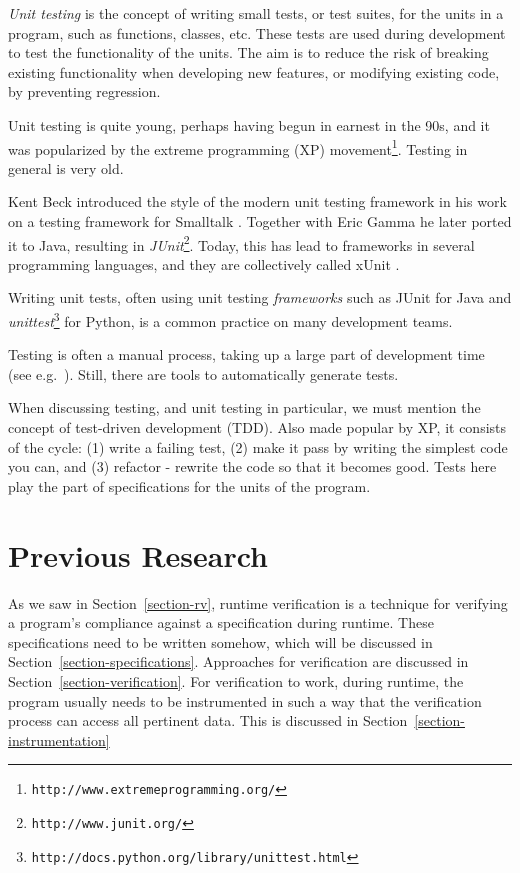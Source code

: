 \documentclass[a4paper,11pt]{kth-mag}
\begin{document}
\textit{Unit testing} is the concept of writing small tests, or test suites,
for the units in a program, such as functions, classes, etc. These tests are
used during development to test the functionality of the units. The aim is to
reduce the risk of breaking existing functionality when developing new
features, or modifying existing code, by preventing regression.

Unit testing is quite young, perhaps having begun in earnest in the 90s, and it
was popularized by the extreme programming (XP)
movement\footnote{\texttt{http://www.extremeprogramming.org/}}. Testing in
general is very old.

Kent Beck introduced the style of the modern unit testing framework in his work
on a testing framework for Smalltalk \cite{becksmalltalktesting}. Together
with Eric Gamma he later ported it to Java, resulting in
\textit{JUnit}\footnote{\texttt{http://www.junit.org/}}.
Today, this has lead to frameworks in several programming languages, and they
are collectively called xUnit \cite{fowlerxunit}.

Writing unit tests, often using unit testing \textit{frameworks} such as JUnit
for Java and
\textit{unittest}\footnote{\texttt{http://docs.python.org/library/unittest.html}}
for Python, is a common practice on many development teams.

Testing is often a manual process, taking up a large part of development time
(see e.g.\ \cite{brooks75mythicalmanmonth}). Still, there are tools to
automatically generate tests.

When discussing testing, and unit testing in particular, we must mention the
concept of test-driven development (TDD). Also made popular by XP, it consists
of the cycle: (1) write a failing test, (2) make it pass by writing the
simplest code you can, and (3) refactor - rewrite the code so that it becomes
good. Tests here play the part of specifications for the units of the program.






\pagestyle{newchap}
\chapter{Previous Research} \label{chapter-previous-research}

As we saw in Section~\ref{section-rv}, runtime verification is a technique for
verifying a program's compliance against a specification during runtime. These
specifications need to be written somehow, which will be discussed in
Section~\ref{section-specifications}. Approaches for verification are discussed
in Section~\ref{section-verification}. For verification to work, during
runtime, the program usually needs to be instrumented in such a way that the
verification process can access all pertinent data. This is discussed in
Section~\ref{section-instrumentation}
\end{document}
